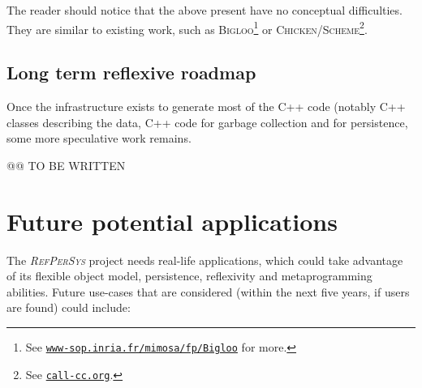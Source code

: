 \documentclass{IEEEtran}
\newcommand{\RefPerSys}{{\textit{\textsc{RefPerSys}}}}
\begin{document}
The reader should notice that the above present have no conceptual
difficulties. They are similar to existing work, such as
\textsc{Bigloo}\footnote{See
\href{https://www-sop.inria.fr/mimosa/fp/Bigloo/}{\texttt{www-sop.inria.fr/mimosa/fp/Bigloo}}
for more.}  \cite{Serrano:1995:bigloo, Bres:2004:bigloo} or
\textsc{Chicken/Scheme}\footnote{See
\href{http://call-cc.org/}{\texttt{call-cc.org}}.}.

\subsection{Long term reflexive roadmap}
\label{shbsec:long-roadmap}

Once the infrastructure exists to generate most of the C++ code
(notably C++ classes describing the data, C++ code for garbage
collection and for persistence, some more speculative work remains.

{\large @@ TO BE WRITTEN}

\section{Future potential applications}
The {\RefPerSys} project needs real-life applications, which could
take advantage of its flexible object model, persistence, reflexivity
and metaprogramming abilities. Future use-cases that are considered
(within the next five years, if users are found) could include:
\end{document}
